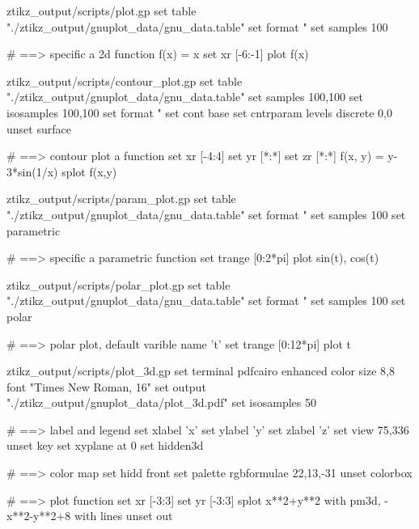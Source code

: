 




\ExplSyntaxOff
\begingroup\newif\ifgnuscript
{}
\ifgnuscript
{}
\begin{filecontents}[noheader]{ztikz_output/scripts/plot.gp}
set table "./ztikz_output/gnuplot_data/gnu_data.table"
set format "%
set samples 100


# ==> specific a 2d function
f(x) = x
set xr [-6:-1]
plot f(x)
\end{filecontents}

\begin{filecontents}[noheader]{ztikz_output/scripts/contour_plot.gp}
set table "./ztikz_output/gnuplot_data/gnu_data.table"
set samples 100,100
set isosamples 100,100
set format "%
set cont base
set cntrparam levels discrete 0,0
unset surface


# ==> contour plot a function
set xr [-4:4]
set yr [*:*]
set zr [*:*]
f(x, y) = y-3*sin(1/x)
splot f(x,y)
\end{filecontents}

\begin{filecontents}[noheader]{ztikz_output/scripts/param_plot.gp}
set table "./ztikz_output/gnuplot_data/gnu_data.table"
set format "%
set samples 100
set parametric


# ==> specific a parametric function
set trange [0:2*pi]
plot sin(t), cos(t)  
\end{filecontents}

\begin{filecontents}[noheader]{ztikz_output/scripts/polar_plot.gp}
set table "./ztikz_output/gnuplot_data/gnu_data.table"
set format "%
set samples 100
set polar


# ==> polar plot, default varible name 't'
set trange [0:12*pi]
plot t
\end{filecontents}

\begin{filecontents}[noheader]{ztikz_output/scripts/plot_3d.gp}
set terminal pdfcairo enhanced color size 8,8 font "Times New Roman, 16"
set output "./ztikz_output/gnuplot_data/plot_3d.pdf"
set isosamples 50


# ==> label and legend
set xlabel 'x'
set ylabel 'y'
set zlabel 'z'
set view 75,336
unset key
set xyplane at 0
set hidden3d


# ==> color map
set hidd front
set palette rgbformulae 22,13,-31
unset colorbox


# ==> plot function
set xr [-3:3]
set yr [-3:3]
splot x**2+y**2 with pm3d, -x**2-y**2+8 with lines
unset out 
\end{filecontents}
\fi\endgroup
\ExplSyntaxOn

